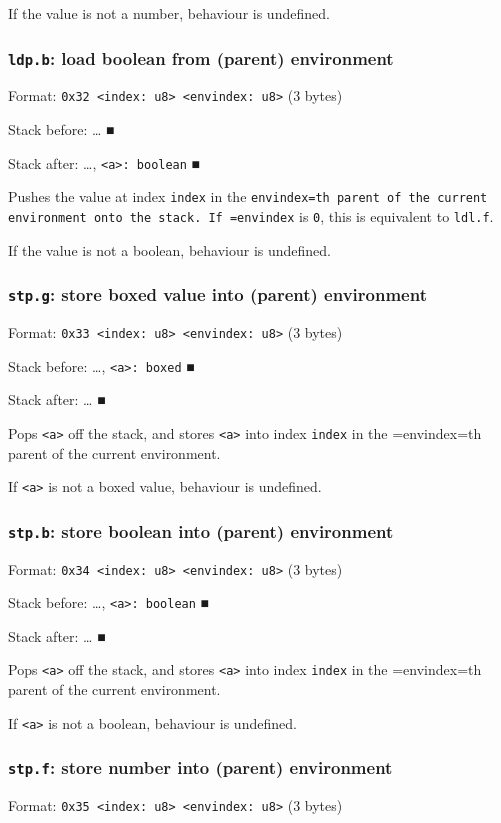 \documentclass[11pt]{article}
\begin{document}
If the value is not a number, behaviour is undefined.

\subsubsection{\texttt{ldp.b}: load boolean from (parent) environment}
\label{sec:org74003ff}
Format: \texttt{0x32 <index: u8> <envindex: u8>} (3 bytes)

Stack before: \ldots{}​ ■

Stack after: \ldots{}​, \texttt{<a>: boolean} ■

Pushes the value at index \texttt{index} in the \texttt{envindex=th parent of the
current environment onto the stack. If =envindex} is \texttt{0}, this is
equivalent to \texttt{ldl.f}.

If the value is not a boolean, behaviour is undefined.

\subsubsection{\texttt{stp.g}: store boxed value into (parent) environment}
\label{sec:org3861b91}
Format: \texttt{0x33 <index: u8> <envindex: u8>} (3 bytes)

Stack before: \ldots{}​, \texttt{<a>: boxed} ■

Stack after: \ldots{}​ ■

Pops \texttt{<a>} off the stack, and stores \texttt{<a>} into index \texttt{index} in the
=envindex=th parent of the current environment.

If \texttt{<a>} is not a boxed value, behaviour is undefined.

\subsubsection{\texttt{stp.b}: store boolean into (parent) environment}
\label{sec:org15feb28}
Format: \texttt{0x34 <index: u8> <envindex: u8>} (3 bytes)

Stack before: \ldots{}​, \texttt{<a>: boolean} ■

Stack after: \ldots{}​ ■

Pops \texttt{<a>} off the stack, and stores \texttt{<a>} into index \texttt{index} in the
=envindex=th parent of the current environment.

If \texttt{<a>} is not a boolean, behaviour is undefined.

\subsubsection{\texttt{stp.f}: store number into (parent) environment}
\label{sec:org4696eef}
Format: \texttt{0x35 <index: u8> <envindex: u8>} (3 bytes)
\end{document}
